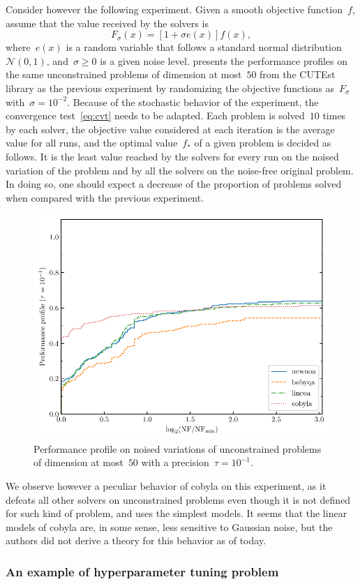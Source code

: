 \documentclass[11pt,draft]{article}
\numberwithin{equation}{section}
\def\obj{\ensuremath{f}}
\begin{document}
Consider however the following experiment.
Given a smooth objective function~$\obj$, assume that the value received by the solvers is
$$F_{\sigma}(x) = [1 + \sigma e(x)] \obj(x),$$
where~$e(x)$ is a random variable that follows a standard normal distribution~$\mathcal{N}(0, 1)$, and~$\sigma \ge 0$ is a given noise level.
 presents the performance profiles on the same unconstrained problems of dimension at most~$50$ from the CUTEst library as the previous experiment by randomizing the objective functions as~$F_{\sigma}$ with~$\sigma = 10^{-2}$.
Because of the stochastic behavior of the experiment, the convergence test~\cref{eq:cvt} needs to be adapted.
Each problem is solved~$10$ times by each solver, the objective value considered at each iteration is the average value for all runs, and the optimal value~$f_{\ast}$ of a given problem is decided as follows.
It is the least value reached by the solvers for every run on the noised variation of the problem and by all the solvers on the noise-free original problem.
In doing so, one should expect a decrease of the proportion of problems solved when compared with the previous experiment.

\begin{figure}[ht]
    \centering
    \includegraphics[width=.48\textwidth]{pp50-noisy.pdf}
    \caption{Performance profile on noised variations of unconstrained problems of dimension at most~$50$ with a precision~$\tau = 10^{-1}$.}
    \label{fig:ppun-50}
\end{figure}

We observe however a peculiar behavior of \gls{cobyla} on this experiment, as it defeats all other solvers on unconstrained problems even though it is not defined for such kind of problem, and uses the simplest models.
It seems that the linear models of \gls{cobyla} are, in some sense, less sensitive to Gaussian noise, but the authors did not derive a theory for this behavior as of today.

\subsubsection{An example of hyperparameter tuning problem}
\end{document}
